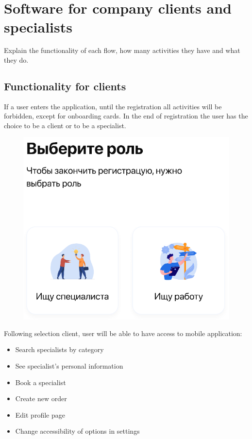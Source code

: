 \section{Software for company clients and specialists}
\hspace{7mm}Explain the functionality of each flow, how many activities they have and what they do.
\subsection{Functionality for clients}
\hspace{7mm}If a user enters the application, until the registration all activities will be forbidden, except for onboarding cards. In the end of registration the user has the choice to be a client or to be a specialist.
\begin{figure}[H]
    \centering
    \includegraphics[scale=0.85]{images/func1.png}
\end{figure}
\hspace{-0.5cm}Following selection client, user will be able to have access to mobile application:
\begin{itemize}
    \item Search specialists by category
    \item See specialist’s personal information
    \item Book a specialist
    \item Create new order
    \item Edit profile page
    \item Change accessibility of options in settings
\end{itemize}



